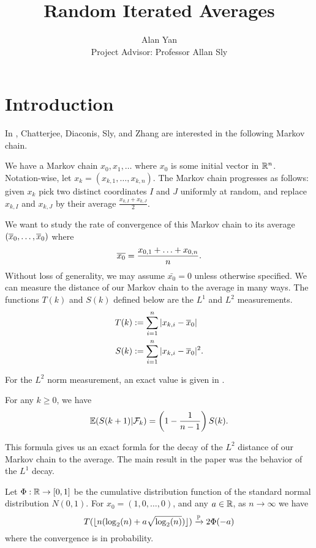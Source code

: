\documentclass[12pt]{article}
\title{Random Iterated Averages}
\author{Alan Yan \\ Project Advisor: Professor Allan Sly}
\begin{document}
\maketitle
\tableofcontents

\newpage 

\section{Introduction}

In \cite{chatterjee2021phase}, Chatterjee, Diaconis, Sly, and Zhang are interested in the following Markov chain. 
\begin{defn}
	We have a Markov chain $x_0, x_1, \ldots$ where $x_0$ is some initial vector in $\mathbb{R}^n$. Notation-wise, let $x_k = (x_{k, 1}, \ldots, x_{k,n})$. The Markov chain progresses as follows: given $x_k$ pick two distinct coordinates $I$ and $J$ uniformly at random, and replace $x_{k, I}$ and $x_{k, J}$ by their average $\frac{x_{k, I} + x_{k, J}}{2}$.
\end{defn}
We want to study the rate of convergence of this Markov chain to its average $(\overline{x}_0, \ldots, \overline{x}_0)$ where
\[
	\overline{x_0} = \frac{x_{0, 1} + \ldots + x_{0, n}}{n}.	
\]
Without loss of generality, we may assume $\bar{x_0} = 0$ unless otherwise specified. We can measure the distance of our Markov chain to the average in many ways. The functions $T(k)$ and $S(k)$ defined below are the $L^1$ and $L^2$ measurements. 
\begin{align*}
	T(k) & := \sum_{i = 1}^n |x_{k, i} - \overline{x}_0| \\
	S(k) & := \sum_{i = 1}^n |x_{k, i} - \overline{x}_0|^2.
\end{align*}

For the $L^2$ norm measurement, an exact value is given in \cite{chatterjee2021phase}.

\begin{prop}
	For any $k \geq 0$, we have 
	\[
		\mathbb{E} (S(k+1) | \mathcal{F}_k) = \left ( 1 - \frac{1}{n-1} \right ) S(k).
	\]	
\end{prop}

This formula gives us an exact formla for the decay of the $L^2$ distance of our Markov chain to the average. The main result in the paper was the behavior of the $L^1$ decay. 

\begin{thm} \label{main-theorem}
	Let $\Phi : \mathbb{R} \to [0, 1]$ be the cumulative distribution function of the standard normal distribution $N(0, 1)$. For $x_0 = (1, 0, \ldots, 0)$, and any $a \in \mathbb{R}$, as $n \to \infty$ we have 
	\[
		T(\lfloor n(\log_2(n) + a \sqrt{\log_2(n)}) \rfloor) \xrightarrow{\mathbb{P}} 2 \Phi(-a)
	\]
	where the convergence is in probability. 
\end{thm}
\end{document}
